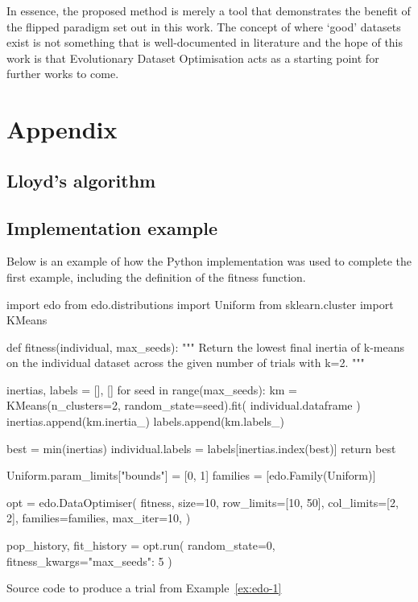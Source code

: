 In essence, the proposed method is merely a tool that demonstrates the benefit
of the flipped paradigm set out in this work. The concept of where `good'
datasets exist is not something that is well-documented in literature and the
hope of this work is that Evolutionary Dataset Optimisation acts as a starting
point for further works to come.


\section*{Appendix}

\subsection{Lloyd's algorithm}\label{app:kmeans}


\subsection{Implementation example}\label{app:code}

Below is an example of how the Python implementation was used to complete the
first example, including the definition of the fitness function.

\begin{listing}[htbp]
\begin{sourcepy}
import edo
from edo.distributions import Uniform
from sklearn.cluster import KMeans

def fitness(individual, max_seeds):
    """ Return the lowest final inertia of k-means on the individual dataset
    across the given number of trials with k=2. """

    inertias, labels = [], []
    for seed in range(max_seeds):
        km = KMeans(n_clusters=2, random_state=seed).fit(
            individual.dataframe
        )
        inertias.append(km.inertia_)
        labels.append(km.labels_)

    best = min(inertias)
    individual.labels = labels[inertias.index(best)]
    return best


Uniform.param_limits["bounds"] = [0, 1]
families = [edo.Family(Uniform)]

opt = edo.DataOptimiser(
    fitness,
    size=10,
    row_limits=[10, 50],
    col_limits=[2, 2],
    families=families,
    max_iter=10,
)

pop_history, fit_history = opt.run(
    random_state=0, fitness_kwargs={"max_seeds": 5}
)

\end{sourcepy}
\caption{Source code to produce a trial from Example~\ref{ex:edo-1}}
\end{listing}
